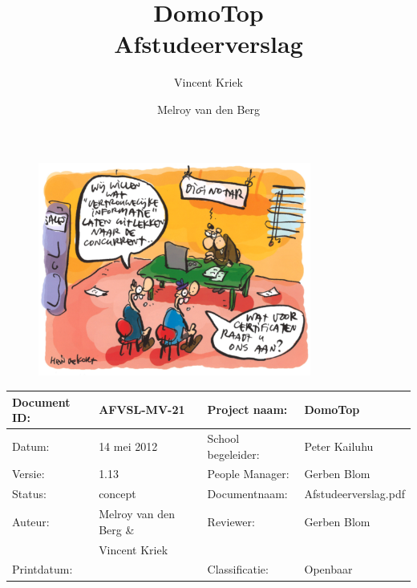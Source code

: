 \documentclass[]{article}
\makeatletter
\let\insertdate\@date
\newcommand{\version}{1.13}
\makeatother
\begin{document}
\thispagestyle{plain}

\title{\textbf{DomoTop} \\Afstudeerverslag}
\author{Vincent Kriek \and Melroy van den Berg}

\maketitle

\begin{figure}[htpb]
   \begin{center}
    \includegraphics[width=0.8\textwidth]{voorkant.pdf}
   \end{center}
\end{figure}

\begin{tabular}{|| l | l || l | l ||}\hline
   Document ID: & AFVSL-MV-21          &Project naam:     &DomoTop             \\\hline
   Datum:       &14 mei 2012          &School begeleider:&Peter Kailuhu       \\\hline
   Versie:      &\version              &People Manager:   &Gerben Blom         \\\hline
   Status:      &concept               &Documentnaam:     &Afstudeerverslag.pdf\\\hline
   Auteur:      &Melroy van den Berg \&&Reviewer:         &Gerben Blom         \\
                &Vincent Kriek         &                  &                    \\\hline
   Printdatum:  &\insertdate           &Classificatie:    &Openbaar            \\\hline
\end{tabular}
\end{document}
